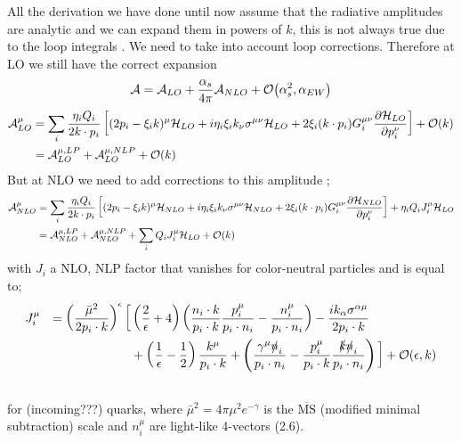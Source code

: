 \documentclass{article}
\newcommand{\s}[1]{\slashed #1}
\begin{document}
All the derivation we have done until now assume that the radiative amplitudes are analytic and we can expand them in powers of $k$, this is not always true due to the loop integrals \cite{Gervais17}.
We need to take into account loop corrections.
Therefore at LO we still have the correct expansion
\begin{equation}
	\mathcal{A} = \mathcal{A}_{LO} + \frac{\alpha_s}{4\pi}\mathcal{A}_{NLO} + \order{\alpha_s^2, \alpha_{EW}}
\end{equation}
\begin{align*}
	\mathcal{A}^\mu_{LO}
	&= \sum_i\frac{\eta_i Q_i}{2k\cdot p_i}\left[(2p_i-\xi_i k)^\mu \mathcal{H}_{LO}
	+i\eta_i\xi_i k_\nu \sigma^{\mu\nu}\mathcal{H}_{LO}
	+2\xi_i (k\cdot p_i)G_i^{\mu \nu}\pdv{\mathcal{H}_{LO}}{p_{i}^\nu}\right]+\order{k}\\&
	= \mathcal{A}^{\mu,LP}_{LO}+\mathcal{A}^{\mu, NLP}_{LO}+\order{k}
\end{align*}
But at NLO we need to add corrections to this amplitude \cite{Bonocore:2015esa, Bonocore:2021cbv};
\begin{align}\label{Bonocore21-4.2}
	\mathcal{A}^\mu_{NLO}
	&= \sum_i\frac{\eta_i Q_i}{2k\cdot p_i}\left[(2p_i-\xi_i k)^\mu \mathcal{H}_{NLO}
	+i\eta_i\xi_i k_\nu \sigma^{\mu\nu}\mathcal{H}_{NLO}
	+2\xi_i (k\cdot p_i)G_i^{\mu \nu}\pdv{\mathcal{H}_{NLO}}{p_{i}^\nu}\right]+\eta_iQ_i J_{i}^\mu\mathcal{H}_{LO}\nonumber\\&
	= \mathcal{A}^{\mu,LP}_{NLO}+\mathcal{A}^{\mu, NLP}_{NLO}+\sum_i Q_i J_{i}^\mu\mathcal{H}_{LO}+\order{k}
\end{align}
with $J_i$ a NLO, NLP factor that vanishes for color-neutral particles and is equal to;
\begin{alignat*}{2}\label{Bonocore15-3.11 Bonocore21-4.3}
	J_{i}^\mu &&= \left(\frac{\bar{\mu}^2}{2p_i\cdot k}\right)^{\epsilon}\bigg[&\left(\frac{2}{\epsilon}+4\right)\left(\frac{n_i\cdot k}{p_i\cdot k}\frac{p_i^\mu}{p_i\cdot n_i}-\frac{n_i^\mu}{p_i\cdot n_i}\right)-\frac{ik_\alpha \sigma^{\alpha\mu}}{2p_i\cdot k}\\&&&+\left(\frac{1}{\epsilon}-\frac{1}{2}\right)\frac{k^\mu}{p_i\cdot k}+\left(\frac{\gamma^\mu \s{n}_i}{p_i\cdot n_i}-\frac{p_i^\mu}{p_i\cdot k}\frac{\s{k}\s{n}_i}{p_i\cdot n_i}\right)\bigg] + \order{\epsilon, k}\\&&
\end{alignat*}
for (incoming???) quarks, where $\bar{\mu}^2 = 4\pi \mu^2 e^{-\gamma}$ is the $\overline{\mathrm{MS}}$ (modified minimal subtraction) scale and $n_i^\mu$ are light-like 4-vectors \cite{Bonocore:2015esa} (2.6).
\end{document}
